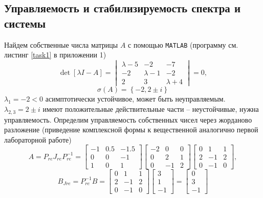 \documentclass[a4paper, 12pt]{article}
\begin{document}
    \subsection{Управляемость и стабилизируемость спектра и системы}
    Найдем собственные числа матрицы $A$ с помощью \texttt{MATLAB} (программу см. листинг \ref{task1} в приложении 1)
    $$
    \det{\left[\lambda I-A\right]}=\begin{vmatrix}
        \lambda-5 &-2 &-7\\
        -2 &\lambda-1 &-2\\
        2 &3 &\lambda+4
    \end{vmatrix}=0,
    $$
    $$
    \sigma\left(A\right)=\left\{-2, 2\pm i\right\}
    $$
    $\lambda_1=-2<0$ асимптотически устойчивое, может быть неуправляемым. $\lambda_{2,3}=2\pm i$ имеют
    положительные действительные части -- неустойчивые, нужна управляемость. Определим управляемость
    собственных чисел через жорданово разложение (приведение комплексной формы к вещественной аналогично первой
    лабораторной работе)
    $$
    A=P_{re}J_{re}P_{re}^{-1}=\begin{bmatrix}
    -1    &0.5   &-1.5\\
    0         &0   &-1\\
    1         &0    &1
    \end{bmatrix}\begin{bmatrix}
    -2     &0     &0\\
     0     &2     &1\\
     0    &-1     &2
    \end{bmatrix}\begin{bmatrix}
    0     &1     &1\\
     2    &-1     &2\\
     0    &-1     &0
    \end{bmatrix},
    $$
    $$
    B_{Jre}=P_{re}^{-1}B=\begin{bmatrix}
        0     &1     &1\\
         2    &-1     &2\\
         0    &-1     &0
        \end{bmatrix}\begin{bmatrix}
            3\\
            1\\
            -1
        \end{bmatrix}=\begin{bmatrix}
        0\\
     3\\
    -1
    \end{bmatrix}
    $$
\end{document}
